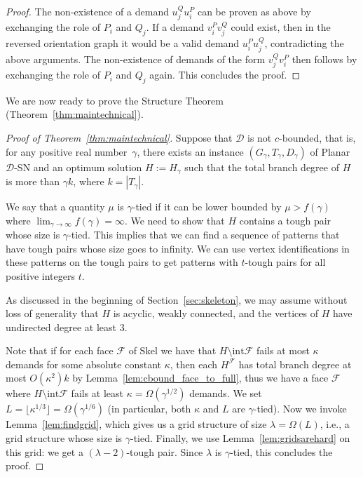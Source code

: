 \documentclass[a4paper,11pt]{article}
\newcommand{\inter}{\mathrm{int}}
\newcommand{\calD}{\mathcal{D}}
\newcommand{\calF}{\mathcal{F}}
\newcommand{\Skel}{\mathrm{Skel}}
\theoremstyle{plain}
\newtheorem{identification rule}{Identification Rule}
\theoremstyle{definition}
\theoremstyle{remark}
\newcommand{\Dsn}{{\sc Planar $\calD$-SN}\xspace}
\begin{document}
\begin{proof}
The non-existence of a demand $u^Q_ju^P_i$ can be proven as above by exchanging the role of $P_i$ and $Q_j$. If a demand $v^P_iv^Q_j$ could exist, then in the reversed orientation graph it would be a valid demand $u^P_iu^Q_j$, contradicting the above arguments. The non-existence of demands of the form $v^Q_jv^P_i$ then follows by exchanging the role of $P_i$ and $Q_j$ again. This concludes the proof.
\end{proof}

We are now ready to prove the Structure Theorem (Theorem~\ref{thm:maintechnical}).

\begin{proof}[Proof of Theorem~\ref{thm:maintechnical}]
Suppose that $\calD$ is not $c$-bounded, that is, for any positive real number~$\gamma$, there exists an instance $(G_\gamma,T_\gamma,D_\gamma)$ of \Dsn and an optimum solution $H:=H_\gamma$ such that the total branch degree of $H$ is more than $\gamma k$, where $k = |T_\gamma|$.

We say that a quantity $\mu$ is $\gamma$-tied if it can be lower bounded by $\mu>f(\gamma)$ where $\lim_{\gamma \rightarrow \infty} f(\gamma)=\infty$. We need to show that $H$ contains a tough pair whose size is $\gamma$-tied. This implies that we can find a sequence of patterns that have tough pairs whose size goes to infinity. We can use vertex identifications in these patterns on the tough pairs to get patterns with $t$-tough pairs for all positive integers $t$.

As discussed in the beginning of Section~\ref{sec:skeleton}, we may assume without loss of generality that $H$ is acyclic, weakly connected, and the vertices of $H$ have undirected degree at least $3$.

Note that if for each face $\calF$ of $\Skel$ we have that $H\setminus \inter \calF$ fails at most $\kappa$ demands for some absolute constant $\kappa$, then each $H^\calF$ has total branch degree at most $O(\kappa^2)k$ by Lemma~\ref{lem:cbound_face_to_full}, thus we have a face $\calF$ where $H\setminus \inter \calF$ fails at least $\kappa=\Omega(\gamma^{1/2})$ demands. We set $L=\lfloor \kappa^{1/3}\rfloor =\Omega(\gamma^{1/6})$ (in particular, both $\kappa$ and $L$ are  $\gamma$-tied). Now we invoke Lemma~\ref{lem:findgrid}, which gives us a grid structure of size $\lambda=\Omega(L)$, i.e., a grid structure whose size is $\gamma$-tied. Finally, we use Lemma~\ref{lem:gridsarehard} on this grid: we get a $(\lambda-2)$-tough pair. Since $\lambda$ is $\gamma$-tied, this concludes the proof.
\end{proof}
\end{document}
